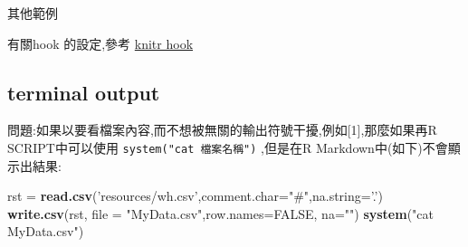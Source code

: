 \documentclass[]{book}
\newenvironment{Shaded}{\begin{snugshade}}{\end{snugshade}}
\newcommand{\CharTok}[1]{\textcolor[rgb]{0.31,0.60,0.02}{#1}}
\newcommand{\CommentTok}[1]{\textcolor[rgb]{0.56,0.35,0.01}{\textit{#1}}}
\newcommand{\ControlFlowTok}[1]{\textcolor[rgb]{0.13,0.29,0.53}{\textbf{#1}}}
\newcommand{\DataTypeTok}[1]{\textcolor[rgb]{0.13,0.29,0.53}{#1}}
\newcommand{\KeywordTok}[1]{\textcolor[rgb]{0.13,0.29,0.53}{\textbf{#1}}}
\newcommand{\NormalTok}[1]{#1}
\newcommand{\OperatorTok}[1]{\textcolor[rgb]{0.81,0.36,0.00}{\textbf{#1}}}
\newcommand{\OtherTok}[1]{\textcolor[rgb]{0.56,0.35,0.01}{#1}}
\newcommand{\StringTok}[1]{\textcolor[rgb]{0.31,0.60,0.02}{#1}}
\theoremstyle{definition}
\theoremstyle{definition}
\theoremstyle{definition}
\theoremstyle{remark}
\begin{document}
其他範例

\begin{Shaded}
\end{Shaded}

有關hook 的設定,參考
\href{https://yihui.name/knitr/hooks/\#output-hooks}{knitr hook}

\hypertarget{terminal-output}{%
\subsection{terminal output}\label{terminal-output}}

問題:如果以要看檔案內容,而不想被無關的輸出符號干擾,例如{[}1{]},那麼如果再R
SCRIPT中可以使用 \texttt{system("cat\ 檔案名稱")} ,但是在R
Markdown中(如下)不會顯示出結果:

\begin{Shaded}
\begin{Highlighting}[]
\NormalTok{rst =}\StringTok{ }\KeywordTok{read.csv}\NormalTok{(}\StringTok{'resources/wh.csv'}\NormalTok{,}\DataTypeTok{comment.char=}\StringTok{"#"}\NormalTok{,}\DataTypeTok{na.string=}\StringTok{'.'}\NormalTok{)}
\KeywordTok{write.csv}\NormalTok{(rst, }\DataTypeTok{file =} \StringTok{"MyData.csv"}\NormalTok{,}\DataTypeTok{row.names=}\OtherTok{FALSE}\NormalTok{, }\DataTypeTok{na=}\StringTok{""}\NormalTok{)}
\KeywordTok{system}\NormalTok{(}\StringTok{"cat MyData.csv"}\NormalTok{)}
\end{Highlighting}
\end{Shaded}
\end{document}
